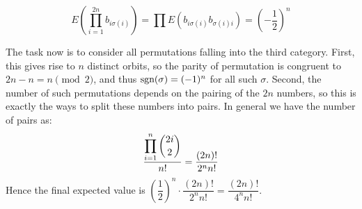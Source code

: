 \documentclass[11pt,a4paper]{article}
\begin{document}
\begin{enumerate}
\begin{enumerate}
		\[E(\prod_{i=1}^{2n}b_{i\sigma(i)})=\prod E(b_{i\sigma(i)}b_{\sigma(i)i})=\left(-\frac 12\right)^n\]
	\end{enumerate}
    The task now is to consider all permutations falling into the third category. First, this gives rise to $n$ distinct orbits, so the parity of permutation is congruent to $2n-n=n\pmod{2}$, and thus $\text{sgn}(\sigma)=(-1)^n$ for all such $\sigma$. Second, the number of such permutations depends on the pairing of the $2n$ numbers, so this is exactly the ways to split these numbers into pairs. In general we have the number of pairs as: 
    \[\frac{\displaystyle\prod_{i=1}^n\dbinom{2i}{2}}{n!}=\dfrac{(2n)!}{2^n n!}\]
    Hence the final expected value is $(\dfrac 12)^n \cdot \dfrac{(2n)!}{2^n n!}=\dfrac{(2n)!}{4^n n!}$. 
		
\end{enumerate}
\end{document}
